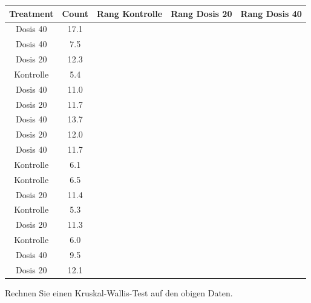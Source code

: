 \documentclass[a4paper, 10pt]{scrartcl}\usepackage[]{graphicx}\usepackage[]{xcolor}
\newenvironment{knitrout}{}{} %
\begin{document}
\begin{knitrout}
\color{fgcolor}\begin{table}[!h]
\centering
\begin{tabular}{ccccc}
\toprule
Treatment & Count & Rang Kontrolle & Rang Dosis 20 & Rang Dosis 40\\
\midrule
Dosis 40 & 17.1 &  &  & \\
Dosis 40 & 7.5 &  &  & \\
Dosis 20 & 12.3 &  &  & \\
Kontrolle & 5.4 &  &  & \\
Dosis 40 & 11.0 &  &  & \\
\addlinespace
Dosis 20 & 11.7 &  &  & \\
Dosis 40 & 13.7 &  &  & \\
Dosis 20 & 12.0 &  &  & \\
Dosis 40 & 11.7 &  &  & \\
Kontrolle & 6.1 &  &  & \\
\addlinespace
Kontrolle & 6.5 &  &  & \\
Dosis 20 & 11.4 &  &  & \\
Kontrolle & 5.3 &  &  & \\
Dosis 20 & 11.3 &  &  & \\
Kontrolle & 6.0 &  &  & \\
\addlinespace
Dosis 40 & 9.5 &  &  & \\
Dosis 20 & 12.1 &  &  & \\
\bottomrule
\end{tabular}
\end{table}

\end{knitrout}

Rechnen Sie einen Kruskal-Wallis-Test auf den obigen Daten.
\end{document}
